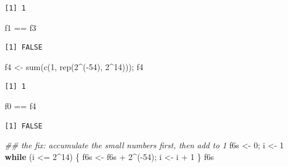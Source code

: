 \documentclass[
  letterpaper,
  DIV=11,
  numbers=noendperiod]{scrreprt}
\newenvironment{Shaded}{\begin{snugshade}}{\end{snugshade}}
\newcommand{\ControlFlowTok}[1]{\textcolor[rgb]{0.00,0.23,0.31}{\textbf{#1}}}
\newcommand{\DecValTok}[1]{\textcolor[rgb]{0.68,0.00,0.00}{#1}}
\newcommand{\DocumentationTok}[1]{\textcolor[rgb]{0.37,0.37,0.37}{\textit{#1}}}
\newcommand{\FunctionTok}[1]{\textcolor[rgb]{0.28,0.35,0.67}{#1}}
\newcommand{\NormalTok}[1]{\textcolor[rgb]{0.00,0.23,0.31}{#1}}
\newcommand{\OtherTok}[1]{\textcolor[rgb]{0.00,0.23,0.31}{#1}}
\newcommand{\SpecialCharTok}[1]{\textcolor[rgb]{0.37,0.37,0.37}{#1}}
\begin{document}
\begin{verbatim}
[1] 1
\end{verbatim}

\begin{Shaded}
\begin{Highlighting}[]
\NormalTok{f1 }\SpecialCharTok{==}\NormalTok{ f3}
\end{Highlighting}
\end{Shaded}

\begin{verbatim}
[1] FALSE
\end{verbatim}

\begin{Shaded}
\begin{Highlighting}[]
\NormalTok{f4 }\OtherTok{\textless{}{-}} \FunctionTok{sum}\NormalTok{(}\FunctionTok{c}\NormalTok{(}\DecValTok{1}\NormalTok{, }\FunctionTok{rep}\NormalTok{(}\DecValTok{2}\SpecialCharTok{\^{}}\NormalTok{(}\SpecialCharTok{{-}}\DecValTok{54}\NormalTok{), }\DecValTok{2}\SpecialCharTok{\^{}}\DecValTok{14}\NormalTok{))); f4}
\end{Highlighting}
\end{Shaded}

\begin{verbatim}
[1] 1
\end{verbatim}

\begin{Shaded}
\begin{Highlighting}[]
\NormalTok{f0 }\SpecialCharTok{==}\NormalTok{ f4}
\end{Highlighting}
\end{Shaded}

\begin{verbatim}
[1] FALSE
\end{verbatim}

\begin{Shaded}
\begin{Highlighting}[]
\DocumentationTok{\#\# the fix: accumulate the small numbers first, then add to 1}
\NormalTok{f6s }\OtherTok{\textless{}{-}} \DecValTok{0}\NormalTok{; i }\OtherTok{\textless{}{-}} \DecValTok{1}
\ControlFlowTok{while}\NormalTok{ (i }\SpecialCharTok{\textless{}=} \DecValTok{2}\SpecialCharTok{\^{}}\DecValTok{14}\NormalTok{) \{ f6s }\OtherTok{\textless{}{-}}\NormalTok{ f6s }\SpecialCharTok{+} \DecValTok{2}\SpecialCharTok{\^{}}\NormalTok{(}\SpecialCharTok{{-}}\DecValTok{54}\NormalTok{); i }\OtherTok{\textless{}{-}}\NormalTok{ i }\SpecialCharTok{+} \DecValTok{1}\NormalTok{ \}}
\NormalTok{f6s}
\end{Highlighting}
\end{Shaded}
\end{document}
